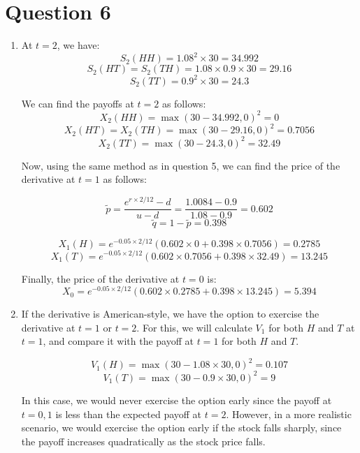 \documentclass[a4paper]{article}
\begin{document}
\newpage
\section*{Question 6}

\begin{enumerate}[label=(\alph*)]

    \item At $t = 2$, we have:
    \[ S_2(HH) = 1.08^2 \times 30 = 34.992 \]
    \[ S_2(HT) = S_2(TH) = 1.08 \times 0.9 \times 30 = 29.16 \]
    \[ S_2(TT) = 0.9^2 \times 30 = 24.3 \]

    We can find the payoffs at $t = 2$ as follows:
    \[ X_2(HH) = \max(30 - 34.992, 0)^2 = 0 \]
    \[ X_2(HT) = X_2(TH) = \max(30 - 29.16, 0)^2 = 0.7056 \]
    \[ X_2(TT) = \max(30 - 24.3, 0)^2 = 32.49 \]

    Now, using the same method as in question 5, we can find the price of the derivative at $t = 1$ as follows:

    \[ \tilde{p} = \frac{e^{r \times 2 / 12} - d}{u - d} = \frac{1.0084 - 0.9}{1.08 - 0.9} = 0.602 \]
    \[ \tilde{q} = 1 - \tilde{p} = 0.398 \]

    \[ X_1(H) = e^{-0.05 \times 2 / 12} \left( 0.602 \times 0 + 0.398 \times 0.7056 \right) = 0.2785 \]
    \[ X_1(T) = e^{-0.05 \times 2 / 12} \left( 0.602 \times 0.7056 + 0.398 \times 32.49 \right) = 13.245 \]

    Finally, the price of the derivative at $t = 0$ is:
    \[ X_0 = e^{-0.05 \times 2 / 12} \left( 0.602 \times 0.2785 + 0.398 \times 13.245 \right) = 5.394 \]


    \vspace{5mm}
    \item If the derivative is American-style, we have the option to exercise the derivative at $t = 1$ or $t = 2$. For this, we will calculate $V_1$ for both $H$ and $T$ at $t = 1$, and compare it with the payoff at $t = 1$ for both $H$ and $T$.

    \[ V_1(H) = \max(30 - 1.08 \times 30, 0)^2 = 0.107 \]
    \[ V_1(T) = \max(30 - 0.9 \times 30, 0)^2 = 9 \]

    In this case, we would never exercise the option early since the payoff at $t = 0, 1$ is less than the expected payoff at $t = 2$. However, in a more realistic scenario, we would exercise the option early if the stock falls sharply, since the payoff increases quadratically as the stock price falls.
\end{enumerate}
\end{document}
